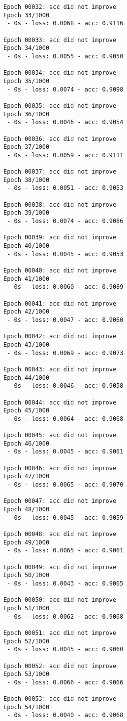 \documentclass[11pt]{article}
\begin{document}
\begin{Verbatim}[commandchars=\\\{\}]
Epoch 00032: acc did not improve
Epoch 33/1000
 - 0s - loss: 0.0068 - acc: 0.9116

Epoch 00033: acc did not improve
Epoch 34/1000
 - 0s - loss: 0.0055 - acc: 0.9050

Epoch 00034: acc did not improve
Epoch 35/1000
 - 0s - loss: 0.0074 - acc: 0.9098

Epoch 00035: acc did not improve
Epoch 36/1000
 - 0s - loss: 0.0046 - acc: 0.9054

Epoch 00036: acc did not improve
Epoch 37/1000
 - 0s - loss: 0.0059 - acc: 0.9111

Epoch 00037: acc did not improve
Epoch 38/1000
 - 0s - loss: 0.0051 - acc: 0.9053

Epoch 00038: acc did not improve
Epoch 39/1000
 - 0s - loss: 0.0074 - acc: 0.9086

Epoch 00039: acc did not improve
Epoch 40/1000
 - 0s - loss: 0.0045 - acc: 0.9053

Epoch 00040: acc did not improve
Epoch 41/1000
 - 0s - loss: 0.0060 - acc: 0.9089

Epoch 00041: acc did not improve
Epoch 42/1000
 - 0s - loss: 0.0047 - acc: 0.9060

Epoch 00042: acc did not improve
Epoch 43/1000
 - 0s - loss: 0.0069 - acc: 0.9073

Epoch 00043: acc did not improve
Epoch 44/1000
 - 0s - loss: 0.0046 - acc: 0.9058

Epoch 00044: acc did not improve
Epoch 45/1000
 - 0s - loss: 0.0064 - acc: 0.9068

Epoch 00045: acc did not improve
Epoch 46/1000
 - 0s - loss: 0.0045 - acc: 0.9061

Epoch 00046: acc did not improve
Epoch 47/1000
 - 0s - loss: 0.0065 - acc: 0.9070

Epoch 00047: acc did not improve
Epoch 48/1000
 - 0s - loss: 0.0045 - acc: 0.9059

Epoch 00048: acc did not improve
Epoch 49/1000
 - 0s - loss: 0.0065 - acc: 0.9061

Epoch 00049: acc did not improve
Epoch 50/1000
 - 0s - loss: 0.0043 - acc: 0.9065

Epoch 00050: acc did not improve
Epoch 51/1000
 - 0s - loss: 0.0062 - acc: 0.9068

Epoch 00051: acc did not improve
Epoch 52/1000
 - 0s - loss: 0.0045 - acc: 0.9060

Epoch 00052: acc did not improve
Epoch 53/1000
 - 0s - loss: 0.0066 - acc: 0.9066

Epoch 00053: acc did not improve
Epoch 54/1000
 - 0s - loss: 0.0040 - acc: 0.9068


\end{Verbatim}
\end{document}
